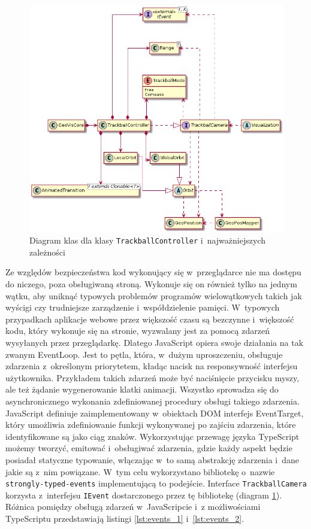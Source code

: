 \begin{figure}
    \centering
    \includegraphics[width=\linewidth]{diagrams/out/c3_trackball.png}
    \caption{Diagram klas dla klasy \texttt{TrackballController} i~najważniejszych zależności}
    \label{fig:c3_trackball}
\end{figure}

Ze względów bezpieczeństwa kod wykonujący się w~przeglądarce nie ma dostępu do niczego, poza obsługiwaną stroną. Wykonuje się on również tylko na jednym wątku, aby uniknąć typowych problemów programów wielowątkowych takich jak wyścigi czy trudniejsze zarządzenie i~współdzielenie pamięci. W~typowych przypadkach aplikacje webowe przez większość czasu są bezczynne i~większość kodu, który wykonuje się na stronie, wyzwalany jest za pomocą zdarzeń wysyłanych przez przeglądarkę. Dlatego JavaScript opiera swoje działania na tak zwanym EventLoop. Jest to pętla, która, w~dużym uproszczeniu, obsługuje zdarzenia z~określonym priorytetem, kładąc nacisk na responsywność interfejsu użytkownika. Przykładem takich zdarzeń może być naciśnięcie przycisku myszy, ale też żądanie wygenerowanie klatki animacji. Wszystko sprowadza się do asynchronicznego wykonania zdefiniowanej procedury obsługi takiego zdarzenia. JavaScript definiuje zaimplementowany w~obiektach DOM interfejs EventTarget\cite{JsEvents}, który umożliwia zdefiniowanie funkcji wykonywanej po zajściu zdarzenia, które identyfikowane są jako ciąg znaków. Wykorzystując przewagę języka TypeScript możemy tworzyć, emitować i~obsługiwać zdarzenia, gdzie każdy aspekt będzie posiadał statyczne typowanie, włączając w~to samą abstrakcję zdarzenia i~dane jakie są z~nim powiązane. W~tym celu wykorzystano bibliotekę o~nazwie \texttt{strongly-typed-events}\cite{Events} implementującą to podejście. Interface \texttt{TrackballCamera} korzysta z~interfejsu \texttt{IEvent} dostarczonego przez tę bibliotekę (diagram \ref{fig:c3_trackball}). Różnica pomiędzy obsługą zdarzeń w~JavaScripcie i~z możliwościami TypeScriptu przedstawiają listingi \ref{lst:events_1} i~\ref{lst:events_2}.


